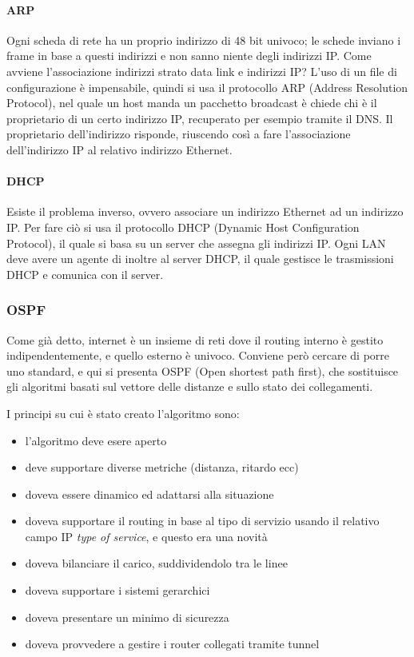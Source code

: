 \paragraph{ARP}
Ogni scheda di rete ha un proprio indirizzo di 48 bit univoco; le schede inviano i frame in base a questi indirizzi e non sanno niente degli indirizzi IP.
Come avviene l'associazione indirizzi strato data link e indirizzi IP?
L'uso di un file di configurazione è impensabile, quindi si usa il protocollo ARP (Address Resolution Protocol), nel quale un host manda un pacchetto broadcast è chiede chi è il proprietario di un certo indirizzo IP, recuperato per esempio tramite il DNS.
Il proprietario dell'indirizzo risponde, riuscendo così a fare l'associazione dell'indirizzo IP al relativo indirizzo Ethernet.

\paragraph{DHCP}
Esiste il problema inverso, ovvero associare un indirizzo Ethernet ad un indirizzo IP.
Per fare ciò si usa il protocollo DHCP (Dynamic Host Configuration Protocol), il quale si basa su un server che assegna gli indirizzi IP.
Ogni LAN deve avere un agente di inoltre al server DHCP, il quale gestisce le trasmissioni DHCP e comunica con il server.

\subsubsection{OSPF}
Come già detto, internet è un insieme di reti dove il routing interno è gestito indipendentemente, e quello esterno è univoco.
Conviene però cercare di porre uno standard, e qui si presenta OSPF (Open shortest path first), che sostituisce gli algoritmi basati sul vettore delle distanze e sullo stato dei collegamenti.

I principi su cui è stato creato l'algoritmo sono:
\begin{itemize}
\item l'algoritmo deve esere aperto
\item deve supportare diverse metriche (distanza, ritardo ecc)
\item doveva essere dinamico ed adattarsi alla situazione
\item doveva supportare il routing in base al tipo di servizio usando il relativo campo IP \textit{type of service}, e questo era una novità
\item doveva bilanciare il carico, suddividendolo tra le linee
\item doveva supportare i sistemi gerarchici
\item doveva presentare un minimo di sicurezza
\item doveva provvedere a gestire i router collegati tramite tunnel
\end{itemize}

